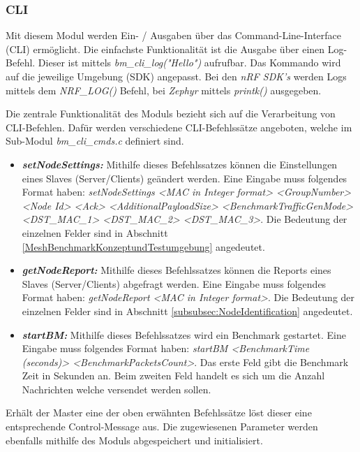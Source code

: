 \subsubsection{CLI}\label{subsubsec:CLI}
Mit diesem Modul werden Ein- / Ausgaben über das Command-Line-Interface (CLI) ermöglicht.
Die einfachste Funktionalität ist die Ausgabe über einen Log-Befehl.
Dieser ist mittels \textit{bm\_cli\_log("Hello")} aufrufbar.
Das Kommando wird auf die jeweilige Umgebung (SDK) angepasst.
Bei den \textit{nRF SDK's} werden Logs mittels dem \textit{NRF\_LOG()} Befehl, bei \textit{Zephyr} mittels \textit{printk()} ausgegeben.

Die zentrale Funktionalität des Moduls bezieht sich auf die Verarbeitung von CLI-Befehlen.
Dafür werden verschiedene CLI-Befehlssätze angeboten, welche im Sub-Modul \textit{bm\_cli\_cmds.c} definiert sind.

\begin{itemize}
	\item \textit{\textbf{setNodeSettings:}} Mithilfe dieses Befehlssatzes können die Einstellungen eines Slaves (Server/Clients) geändert werden. Eine Eingabe muss folgendes Format haben:
	\textit{setNodeSettings <MAC in Integer format> <GroupNumber> <Node Id> <Ack> <AdditionalPayloadSize> <BenchmarkTrafficGenMode> <DST\_MAC\_1> \linebreak <DST\_MAC\_2> <DST\_MAC\_3>}.
	Die Bedeutung der einzelnen Felder sind in Abschnitt \ref{MeshBenchmarkKonzeptundTestumgebung} angedeutet.
	\item \textit{\textbf{getNodeReport:}} Mithilfe dieses Befehlssatzes können die Reports eines Slaves (Server/Clients) abgefragt werden. Eine Eingabe muss folgendes Format haben: 
	\textit{getNodeReport <MAC in Integer format>}. Die Bedeutung der einzelnen Felder sind in Abschnitt \ref{subsubsec:NodeIdentification} angedeutet. 
	\item \textit{\textbf{startBM:}} Mithilfe dieses Befehlssatzes wird ein Benchmark gestartet. Eine Eingabe muss folgendes Format haben:
	\textit{startBM <BenchmarkTime (seconds)> <BenchmarkPacketsCount>}. Das erste Feld gibt die Benchmark Zeit in Sekunden an. Beim zweiten Feld handelt es sich um die Anzahl Nachrichten welche versendet werden sollen. 
\end{itemize}

Erhält der Master eine der oben erwähnten Befehlssätze löst dieser eine entsprechende Control-Message aus.
Die zugewiesenen Parameter werden ebenfalls mithilfe des Moduls abgespeichert und initialisiert. 


